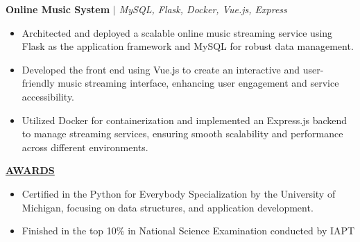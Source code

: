 \documentclass{article}
\begin{document}
\noindent \textbf{Online Music System} \textit{$\mid$ MySQL, Flask, Docker, Vue.js, Express} \hfill \textbf{}
\begin{itemize}[noitemsep,nolistsep,leftmargin=*]
\item {\small Architected and deployed a scalable online music streaming service using Flask as the application framework and MySQL for robust data management.}
\item {\small Developed the front end using Vue.js to create an interactive and user-friendly music streaming interface, enhancing user engagement and service accessibility.}
\item {\small Utilized Docker for containerization and implemented an Express.js backend to manage streaming services, ensuring smooth scalability and performance across different environments.}
\end{itemize}
\vspace{2mm} 
\noindent \textbf{\underline{AWARDS}} 
\begin{itemize}[noitemsep,nolistsep,leftmargin=*]
\item {\small Certified in the Python for Everybody Specialization by the University of Michigan, focusing on data structures, and application development.}
\item {\small Finished in the top 10\% in National Science Examination conducted by IAPT}
\end{itemize}

\end{document}

